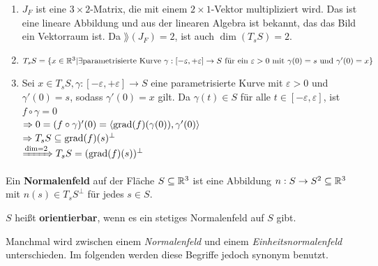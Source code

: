 \begin{beweis}\leavevmode
    \begin{enumerate}[label=\alph*)]
        \item $J_F$ ist eine $3 \times 2$-Matrix, die mit einem $2 \times 1$-Vektor
              multipliziert wird. Das ist eine lineare Abbildung und aus der 
              linearen Algebra ist bekannt, das das Bild ein Vektorraum ist.
              Da $\rang(J_F) = 2$, ist auch $\dim (T_s S) = 2$.
        \item $T_s S = \{x \in \mathbb{R}^3 | \exists \text{parametrisierte Kurve } 
          \gamma:[- \varepsilon, + \varepsilon] \rightarrow S 
          \text{ für ein } \varepsilon > 0 
          \text{ mit } \gamma(0) = s \text{ und } \gamma'(0) = x
          \}$
        \item Sei $x \in T_s S, \gamma:[-\varepsilon, +\varepsilon] \rightarrow S$
    eine parametrisierte Kurve mit $\varepsilon > 0$ und $\gamma'(0) = s$,
    sodass $\gamma'(0) = x$ gilt. Da $\gamma(t) \in S$ für alle
    $t \in [-\varepsilon, \varepsilon]$, ist $f \circ \gamma = 0$\\
    $\Rightarrow 0 = (f \circ \gamma)'(0) = \langle \operatorname{grad}(f)(\gamma(0)), \gamma'(0) \rangle$\\
    $\Rightarrow T_s S \subseteq \operatorname{grad} (f)(s)^\perp$\\
    $\xRightarrow{\dim = 2} T_s S = (\operatorname{grad}(f)(s))^\perp$
    \end{enumerate}
\end{beweis}

\begin{definition}%
    \begin{defenum}
        \item Ein \textbf{Normalenfeld} auf der
              Fläche $S \subseteq \mathbb{R}^3$ ist eine Abbildung $n: S \rightarrow S^2 \subseteq \mathbb{R}^3$
              mit $n(s) \in T_s S^\perp$ für jedes $s \in S$.
        \item $S$ heißt \textbf{orientierbar},
              wenn es ein stetiges Normalenfeld auf $S$ gibt.
    \end{defenum}
\end{definition}

Manchmal wird zwischen einem \textit{Normalenfeld} und einem
\textit{Einheitsnormalenfeld} unterschieden.
Im folgenden werden diese Begriffe jedoch synonym benutzt.

